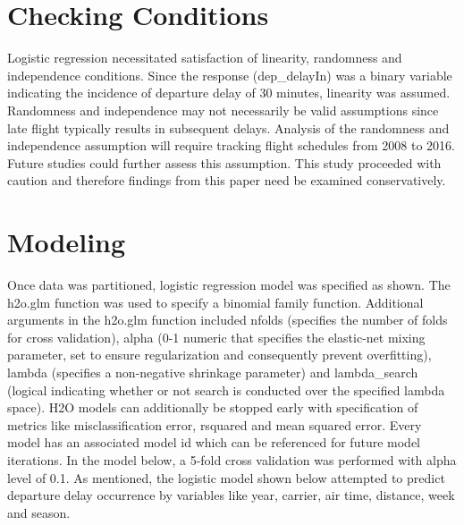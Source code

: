 \documentclass[12pt,twoside]{amherstthesis}
\begin{document}
  \begin{Shaded}
  \end{Shaded}
  
  \section{Checking Conditions}\label{checking-conditions}
  
  Logistic regression necessitated satisfaction of linearity, randomness
  and independence conditions. Since the response (dep\_delayIn) was a
  binary variable indicating the incidence of departure delay of 30
  minutes, linearity was assumed. Randomness and independence may not
  necessarily be valid assumptions since late flight typically results in
  subsequent delays. Analysis of the randomness and independence
  assumption will require tracking flight schedules from 2008 to 2016.
  Future studies could further assess this assumption. This study
  proceeded with caution and therefore findings from this paper need be
  examined conservatively.
  
  \section{Modeling}\label{modeling}
  
  Once data was partitioned, logistic regression model was specified as
  shown. The h2o.glm function was used to specify a binomial family
  function. Additional arguments in the h2o.glm function included nfolds
  (specifies the number of folds for cross validation), alpha (0-1 numeric
  that specifies the elastic-net mixing parameter, set to ensure
  regularization and consequently prevent overfitting), lambda (specifies
  a non-negative shrinkage parameter) and lambda\_search (logical
  indicating whether or not search is conducted over the specified lambda
  space). H2O models can additionally be stopped early with specification
  of metrics like misclassification error, rsquared and mean squared
  error. Every model has an associated model id which can be referenced
  for future model iterations. In the model below, a 5-fold cross
  validation was performed with alpha level of 0.1. As mentioned, the
  logistic model shown below attempted to predict departure delay
  occurrence by variables like year, carrier, air time, distance, week and
  season.
  
\end{document}
